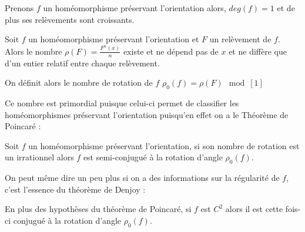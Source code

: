 \documentclass[11pt,a4paper]{article}
\begin{document}
\begin{prop}
Prenons $f$ un homéomorphisme préservant l'orientation alors, $deg(f)=1$ et de plus ses relèvements sont croissants.
\end{prop}

\begin{prop}
Soit $f$ un homéomorphisme préservant l'orientation et $F$ un relèvement de $f$. Alors le nombre $\rho (F)= \frac{F^n(x)}{n}$ existe et ne dépend pas de $x$ et ne diffère que d'un entier relatif entre chaque relèvement.
\end{prop}

\begin{defin}
On définit alors le nombre de rotation de $f$ $\rho_0(f) = \rho (F) \mod[1]$
\end{defin}
Ce nombre est primordial puisque celui-ci permet de classifier les homéomorphismes préservant l'orientation puisqu'en effet on a le Théorème de Poincaré :
\begin{thm}\label{Théorème de Poincaré}
Soit $f$ un homéomorphisme préservant l'orientation, si son nombre de rotation est un irrationnel alors $f$ est semi-conjugué à la rotation d'angle $\rho_0(f)$.
\end{thm}
On peut même dire un peu plus si on a des informations sur la régularité de $f$, c'est l'essence du théorème de Denjoy :
\begin{thm}\label{Théorème Denjoy}
En plus des hypothèses du théorème de Poincaré, si $f$ est $C^2$ alors il est cette fois-ci conjugué à la rotation d'angle $\rho_0(f)$.
\end{thm}
\end{document}
